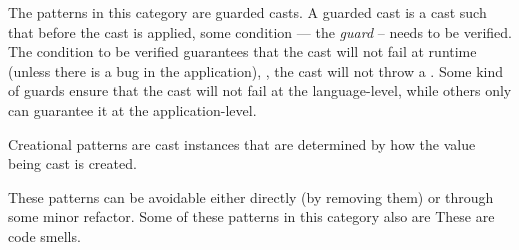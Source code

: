 The patterns in this category are guarded casts.
A guarded cast is a cast such that before the cast is applied,
some condition --- the \emph{guard} -- needs to be verified.
The condition to be verified guarantees that the cast will not fail at runtime (unless there is a bug in the application), \ie,
the cast will not throw a .
Some kind of guards ensure that the cast will not fail at the language-level,
while others only can guarantee it at the application-level.

Creational patterns are cast instances that are determined by how the value being cast is created.

These patterns can be avoidable either directly (by removing them)
or through some minor refactor.
Some of these patterns in this category also are 
These are code smells.


\newcommand{\castpatternsection}[1]{\paragraph{#1.}}
\newenvironment{pattern}[1]{
    \newcommand{\nocc}{\csname n#1Pattern\endcsname{}}
    \newcommand{\noccsrc}{\csname n#1PatternSrc\endcsname{}}
    \newcommand{\noccgen}{\csname n#1PatternGen\endcsname{}}
    \newcommand{\nocctest}{\csname n#1PatternTest\endcsname{}}
    \newcommand{\pocc}{\csname p#1Pattern\endcsname{}}
    \newcommand{\instances}{\castpatternsection{Instances: \nocc{} (\pocc\%)}
    We found \noccsrc{} in application code, \nocctest{} in test code, and \noccgen{} in generated code.}
    \newcommand{\discussion}{\castpatternsection{Discussion}}
    \newcommand{\thisp}{\textsc{#1}}
    \subsection{\textsc{#1}}
    \label{pat:#1}
    \castpatternsection{Description}
}{}

